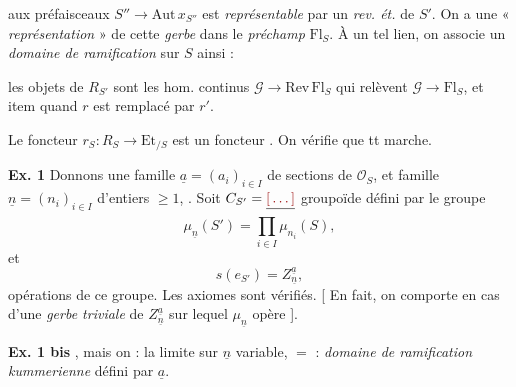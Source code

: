 \documentclass[11pt,a4paper]{article}
\begin{document}

aux préfaisceaux $S'' \longrightarrow \mathrm{Aut}\, x_{S''}$ est
\emph{représentable} par un  \emph{rev. ét.} de
$S'$. On a une « \emph{représentation} » de cette \emph{gerbe} dans le
\emph{préchamp} $\mathrm{Fl}_S$. À un tel lien, on associe un \emph{domaine de
ramification} sur $S$ ainsi :


les objets de $R_{S'}$ sont les hom. continus
$\mathcal{G} \longrightarrow \mathrm{Rev}\,\mathrm{Fl}_S$ qui relèvent
$\mathcal{G} \to \mathrm{Fl}_S$, et item quand $r$ est remplacé par $r'$.

Le foncteur $r_S : R_S \longrightarrow \mathrm{Et}_{/S}$ est un
foncteur . On vérifie que tt marche.


\textbf{Ex. 1} Donnons \struck{\ill{}} une famille
$\underline{a} = (a_i)_{i \in I}$ de sections de $\mathcal{O}_S$, 
et famille $\underline{n} = (n_i)_{i \in I}$ d'entiers
$\geq 1$, \struck{\ill{}} . Soit
$C_{S'} = \struck{\ill{}}$ groupoïde défini par le groupe
\[
  \mu_{\underline{n}}(S') = \prod_{i \in I} \mu_{n_i}(S) ,
\]
 \struck{\ill{}} et
\[
  s(e_{S'}) = Z^{\underline{a}}_{\underline{n}} ,
\]
 opérations  de ce groupe. Les axiomes sont vérifiés. [ En
fait, on \ill{} comporte en cas d'une \emph{gerbe triviale} de \ill{}
$Z^{\underline{a}}_{\underline{n}}$ sur lequel $\mu_{\underline{n}}$ opère ].

\textbf{Ex. 1 bis} , mais on  : la limite
sur $\underline{n}$ variable, $=$ \ill{} : \emph{domaine de ramification
kummerienne} défini par $\underline{a}$.
\end{document}
